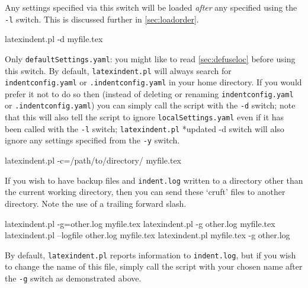 	Any settings specified via this switch will be loaded \emph{after} any
	specified using the \texttt{-l} switch. This is discussed further in
	\vref{sec:loadorder}.
	\begin{commandshell}
latexindent.pl -d myfile.tex
\end{commandshell}

	Only \texttt{defaultSettings.yaml}: you might like to read \cref{sec:defuseloc} before using
	this switch. By default, \texttt{latexindent.pl} will always search for
	\texttt{indentconfig.yaml} or \texttt{.indentconfig.yaml} in your home directory. If you would
	prefer it not to do so then (instead of deleting or renaming \texttt{indentconfig.yaml} or
	\texttt{.indentconfig.yaml}) you can simply call the script with the \texttt{-d}
	switch; note that this will also tell the script to ignore \texttt{localSettings.yaml} even
	if it has been called with the \texttt{-l} switch; \texttt{latexindent.pl}%
	*{updated -d switch} will also ignore any settings specified from the
	\texttt{-y} switch.

	\begin{commandshell}
latexindent.pl -c=/path/to/directory/ myfile.tex
\end{commandshell}

	If you wish to have backup files and \texttt{indent.log} written to a directory other
	than the current working directory, then you can send these `cruft' files to another
	directory. Note the use of a trailing forward slash. %

	\begin{commandshell}
latexindent.pl -g=other.log myfile.tex
latexindent.pl -g other.log myfile.tex
latexindent.pl --logfile other.log myfile.tex
latexindent.pl myfile.tex -g other.log 
\end{commandshell}

	By default, \texttt{latexindent.pl} reports information to \texttt{indent.log}, but
	if you wish to change the name of this file, simply call the script with your chosen name
	after the \texttt{-g} switch as demonstrated above.

